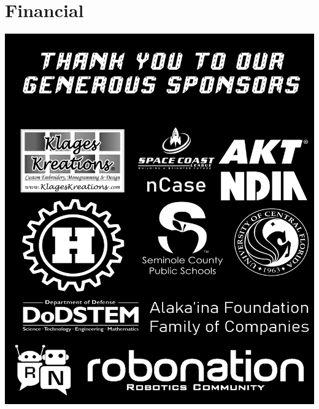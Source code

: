 \documentclass[
letterpaper, %
11pt, %
twoside,
onecolumn, %
openright, %
]{report}
\begin{document}
\chapter{Financial}
\vspace{3em}
\begin{minipage}[c]{\linewidth}
\centering
\includegraphics[width=\linewidth]{Images/Main/League Shirt Sponsors Draft 1}
\end{minipage}



                  

\end{document}
